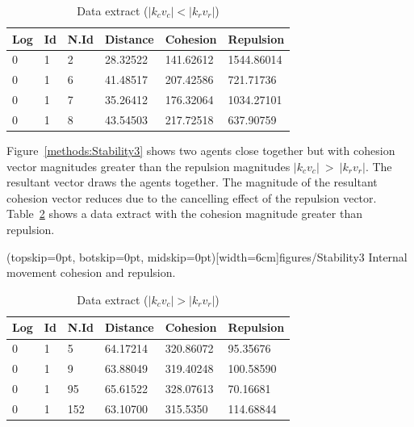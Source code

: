 \documentclass{ieeeaccess}
\begin{document}
\begin{table}[H]
\begin{center}
\begin{tabular}{| l | l | l | l | l | l |}
\hline
Log &	Id &	N.Id &	Distance &	{\color{green}Cohesion} &	{\color{red}Repulsion} 	\\ \hline
0 & 1 & 2 & 28.32522 & {\color{green}141.62612} & {\color{red}1544.86014} \\ \hline
0 & 1 & 6 & 41.48517 & {\color{green}207.42586} & {\color{red}721.71736} \\ \hline
0 & 1 & 7 & 35.26412 & {\color{green}176.32064} & {\color{red}1034.27101} \\ \hline
0 & 1 & 8 & 43.54503 & {\color{green}217.72518} & {\color{red}637.90759} \\
\hline
\end{tabular}\caption{Data extract ($|k_cv_c| < |k_rv_r|$)} \label{tab:SampleReplusionPositive}
\end{center}
\end{table}

Figure~\ref{methods:Stability3} shows two agents close together but with cohesion vector magnitudes greater than the repulsion magnitudes $|k_cv_c|~>~|k_rv_r|$. The resultant vector draws the agents together. The magnitude of the resultant cohesion vector reduces due to the cancelling effect of the repulsion vector. Table~\ref{tab:SampleCohesionPositive} shows a data extract with the cohesion magnitude greater than repulsion.

\Figure[t!](topskip=0pt, botskip=0pt, midskip=0pt)[width=6cm]{figures/Stability3}
{Internal movement cohesion and repulsion.\label{methods:Stability3}}


\begin{table}[H]
\begin{center}
\begin{tabular}{| l | l | l | l | l | l |}
\hline
Log &	Id &	N.Id &	Distance &	{\color{green}Cohesion} & {\color{red}Repulsion} 	\\ \hline
0 & 1 & 5 &	64.17214 &	{\color{green}320.86072} &	{\color{red}95.35676} \\ \hline
0 & 1 & 9 &	63.88049 &	{\color{green}319.40248} &	{\color{red}100.58590} \\ \hline
0 & 1 & 95 & 65.61522 &	{\color{green}328.07613} &	{\color{red}70.16681} \\ \hline
0 & 1 & 152 & 63.10700 & {\color{green}315.5350} & {\color{red}114.68844} \\ 
\hline
\end{tabular}\caption{Data extract ($|k_cv_c| > |k_rv_r|$)} \label{tab:SampleCohesionPositive}
\end{center}
\end{table}
\end{document}
